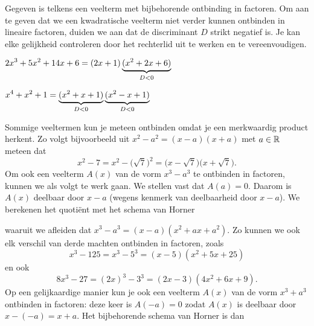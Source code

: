 \documentclass{ximera}
\begin{document}
\begin{example} 
Gegeven is telkens een veelterm met bijbehorende ontbinding in factoren. Om aan te geven dat we een kwadratische veelterm niet verder kunnen ontbinden in lineaire factoren, duiden we aan dat de discriminant \(D\) strikt negatief is. Je kan elke gelijkheid controleren door het rechterlid uit te werken en te vereenvoudigen. 

\begin{question} \(\displaystyle 2x^3 + 5x^2 + 14x + 6 = (2x+1)\underbrace{(x^2+2x+6)}_{D < 0}\)            \end{question}
\begin{question} \(\displaystyle x^4+x^2+1 = \underbrace{(x^2+x+1)}_{D < 0}\underbrace{(x^2-x+1)}_{D < 0}\) \end{question}

\end{example} 



Sommige veeltermen kun je meteen ontbinden omdat je een merkwaardig product herkent. Zo volgt bijvoorbeeld uit \(x^2 - a^2 = (x-a)(x+a)\) met \(a \in \mathbb{R}\) meteen dat
\[
x^2 - 7 = x^2 - \bigl(\sqrt{7}\bigr)^2 = \bigl(x-\sqrt{7})(x+\sqrt{7}\bigr). 
\]
Om ook een veelterm \(A(x)\) van de vorm \(x^3 - a^3\) te ontbinden in factoren, kunnen we als volgt te werk gaan.
We stellen vast dat \(A(a) = 0\). Daarom is \(A(x)\) deelbaar door \(x-a\) (wegens kenmerk van deelbaarheid door \(x-a\)). We berekenen het quotiënt met het schema van Horner
\renewcommand{\kolbreed}{\widthof{\(-a^3\)}}


waaruit we afleiden dat \(x^3 - a^3 = (x-a)(x^2 + ax + a^2)\). Zo kunnen we ook elk verschil van derde machten ontbinden in factoren, zoals
\[
x^3 - 125 = x^3 - 5^3 = (x-5)(x^2 + 5x + 25) 
\]
en ook
\[
8x^3 - 27 = (2x)^3 - 3^3 = (2x-3)(4x^2+6x+9).
\]
Op een gelijkaardige manier kun je ook een veelterm \(A(x)\) van de vorm \(x^3 + a^3\) ontbinden in factoren: deze keer is \(A(-a) = 0\) zodat \(A(x)\) is deelbaar door \(x-(-a) = x+a\). Het bijbehorende schema van Horner is dan
\renewcommand{\kolbreed}{\widthof{\(-a^3\)}}
\end{document}
